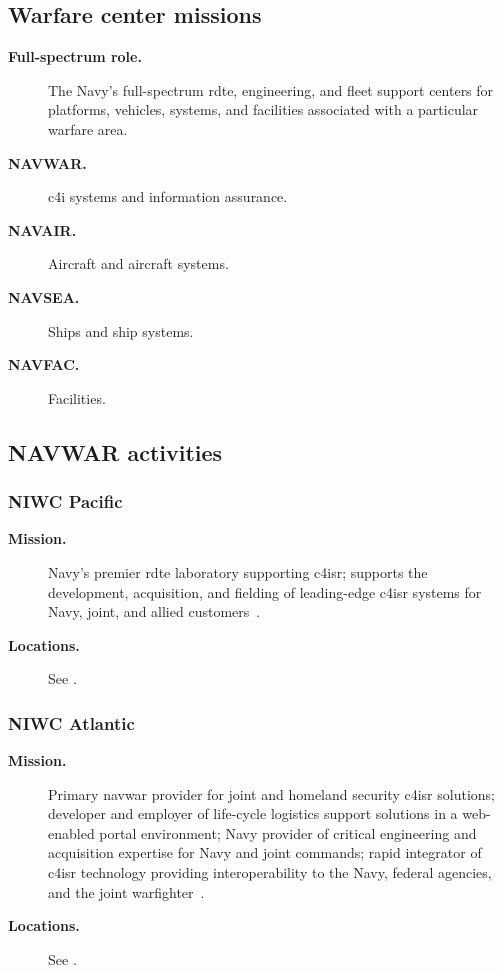 \documentclass[../main.tex]{subfiles}
\begin{document}
\subsection{Warfare center missions}
\begin{description}
  \item[\textbf{Full-spectrum role.}] The Navy's full-spectrum \ac{rdte}, engineering, and fleet support centers for platforms, vehicles, systems, and facilities associated with a particular warfare area.
  \item[\textbf{NAVWAR.}] \ac{c4i} systems and information assurance.
  \item[\textbf{NAVAIR.}] Aircraft and aircraft systems.
  \item[\textbf{NAVSEA.}] Ships and ship systems.
  \item[\textbf{NAVFAC.}] Facilities.
\end{description}

\subsection{NAVWAR activities}
\subsubsection{NIWC Pacific}
\begin{description}
  \item[\textbf{Mission.}] Navy's premier \ac{rdte} laboratory supporting \ac{c4isr}; supports the development, acquisition, and fielding of leading-edge \ac{c4isr} systems for Navy, joint, and allied customers~\autocite{edo-2-1-4-warfare-centers-2024}.
  \item[\textbf{Locations.}] See \Fig{\ref{fig:niwc-pac-locations}}.
\end{description}

\subsubsection{NIWC Atlantic}
\begin{description}
  \item[\textbf{Mission.}] Primary \ac{navwar} provider for joint and homeland security \ac{c4isr} solutions; developer and employer of life-cycle logistics support solutions in a web-enabled portal environment; Navy provider of critical engineering and acquisition expertise for Navy and joint commands; rapid integrator of \ac{c4isr} technology providing interoperability to the Navy, federal agencies, and the joint warfighter~\autocite{edo-2-1-4-warfare-centers-2024}.
  \item[\textbf{Locations.}] See \Fig{\ref{fig:niwc-lant-locations}}.
\end{description}
\end{document}
